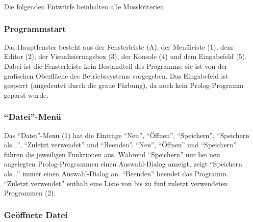 \documentclass[parskip=full,11pt,twoside]{scrartcl}
\begin{document}
Die folgenden Entwürfe beinhalten alle Musskriterien.

\subsubsection{Programmstart}

\begin{minipage}{\linewidth}
\end{minipage}

Das Hauptfenster besteht aus der Fensterleiste (A), der Menüleiste (1), dem Editor (2), der Visualisierungsbox (3), der Konsole (4) und dem Eingabefeld (5).
Dabei ist die Fensterleiste kein Bestandteil des Programms; sie ist von der grafischen Oberfläche des Betriebssystems vorgegeben.
Das Eingabefeld ist gesperrt (angedeutet durch die graue Färbung), da noch kein Prolog-Programm geparst wurde.

\subsubsection{\enquote{Datei}-Menü}

\begin{minipage}{\linewidth}
\end{minipage}

Das \enquote{Datei}-Menü (1) hat die Einträge \enquote{Neu}, \enquote{Öffnen}, \enquote{Speichern}, \enquote{Speichern als...}, \enquote{Zuletzt verwendet} und \enquote{Beenden}.
\enquote{Neu}, \enquote{Öffnen} und \enquote{Speichern} führen die jeweiligen Funktionen aus.
Während \enquote{Speichern} nur bei neu angelegten Prolog-Programmen einen Auswahl-Dialog anzeigt, zeigt \enquote{Speichern als...} immer einen Auswahl-Dialog an.
\enquote{Beenden} beendet das Programm.
\enquote{Zuletzt verwendet} enthält eine Liste von bis zu fünf zuletzt verwendeten Programmen (2).

\subsubsection{Geöffnete Datei}

\begin{minipage}{\linewidth}
\end{minipage}
\end{document}
